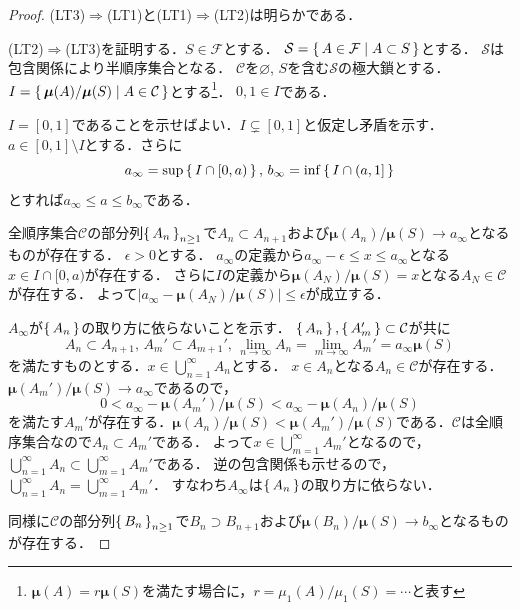 \begin{proof}
  (LT3)\(\Rightarrow\)(LT1)と(LT1)\(\Rightarrow\)(LT2)は明らかである．

  (LT2)\(\Rightarrow\)(LT3)を証明する．\(S \in \mathcal{F}\)とする．
  \(\mathcal{S} = \set{ A \in \mathcal{F} | A \subset S }\)とする．
  \(\mathcal{S}\)は包含関係により半順序集合となる．
  \(\mathcal{C}\)を\(\varnothing\), \(S\)を含む\(\mathcal{S}\)の極大鎖とする．
  \(I = \set{\boldsymbol\mu(A)/\boldsymbol\mu(S) | A \in \mathcal{C}}\)とする\footnote{\(\boldsymbol\mu(A)=r\boldsymbol\mu(S)\)を満たす場合に，\(r=\mu_1(A)/\mu_1(S)=\cdots\)と表す}．
  \(0, 1 \in I\)である．

  \(I = [0, 1]\)であることを示せばよい．\(I \subsetneq [0, 1]\)と仮定し矛盾を示す．
  \(a \in [0, 1] \setminus I\)とする．さらに
  \[ a_\infty = \sup \set{I \cap [0, a)} , \, b_\infty = \inf \set{I \cap (a, 1]} \]
  とすれば\(a_\infty \leq a \leq b_\infty\)である．

  全順序集合\(\mathcal{C}\)の部分列\(\set{A_n}_{n\geq1}\)で\(A_n \subset A_{n+1}\)および\(\boldsymbol\mu(A_n)/\boldsymbol\mu(S) \to a_\infty\)となるものが存在する．
  \(\epsilon>0\)とする．
  \(a_\infty\)の定義から\(a_\infty-\epsilon\leq x\leq a_\infty\)となる\(x \in I \cap [0, a)\)が存在する．
  さらに\(I\)の定義から\(\boldsymbol\mu(A_N)/\boldsymbol\mu(S) =x\)となる\(A_N \in \mathcal{C}\)が存在する．
  よって\(\lvert a_\infty - \boldsymbol\mu(A_N)/\boldsymbol\mu(S) \rvert \leq \epsilon\)が成立する．

  \(A_\infty\)が\(\set{A_n}\)の取り方に依らないことを示す．
  \(\set{A_n}, \set{A_m'} \subset \mathcal{C}\)が共に
  \[
  A_n \subset A_{n+1} , \, A_m' \subset A_{m+1}' ,\,
  \lim_{n\to\infty} A_n = \lim_{m\to\infty} A_m' = a_\infty \boldsymbol\mu(S)
  \]
  を満たすものとする．\(x\in \bigcup_{n=1}^\infty A_n\)とする．
  \(x \in A_n\)となる\(A_n \in \mathcal{C}\)が存在する．
  \(\boldsymbol\mu(A_m')/\boldsymbol\mu(S) \to a_\infty\)であるので，
  \[ 0 < a_\infty - \boldsymbol\mu(A_m')/\boldsymbol\mu(S) < a_\infty - \boldsymbol\mu(A_n)/\boldsymbol\mu(S) \]
  を満たす\(A_m'\)が存在する．\(\boldsymbol\mu(A_n)/\boldsymbol\mu(S) < \boldsymbol\mu(A_m')/\boldsymbol\mu(S)\)である．\(\mathcal{C}\)は全順序集合なので\(A_n \subset A_m'\)である．
  よって\(x \in \bigcup_{m=1}^\infty A_m'\)となるので，\(\bigcup_{n=1}^\infty A_n \subset \bigcup_{m=1}^\infty A_m'\)である．
  逆の包含関係も示せるので，\(\bigcup_{n=1}^\infty A_n = \bigcup_{m=1}^\infty A_m'\)．
  すなわち\(A_\infty\)は\(\set{A_n}\)の取り方に依らない．

  同様に\(\mathcal{C}\)の部分列\(\set{B_n}_{n\geq1}\)で\(B_n \supset B_{n+1}\)および\(\boldsymbol\mu(B_n)/\boldsymbol\mu(S) \to b_\infty\)となるものが存在する．


\end{proof}

